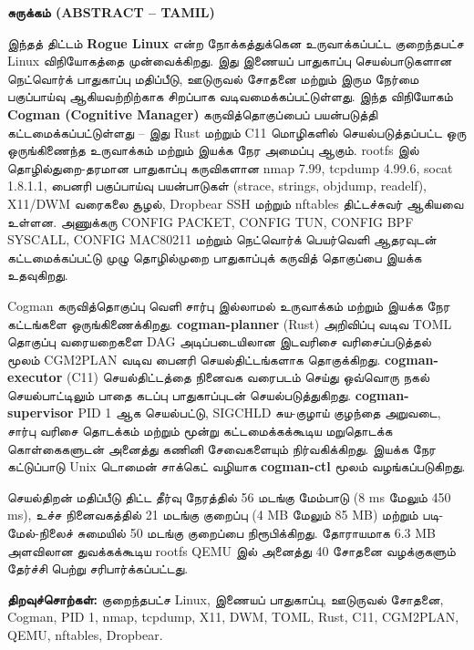 \documentclass[12pt,a4paper]{article}
\begin{document}
\thispagestyle{plain}

\begin{center}
  {\large\bfseries சுருக்கம் (ABSTRACT -- TAMIL)}
\end{center}
\vspace{10pt}

இந்தத் திட்டம் \textbf{Rogue Linux} என்ற நோக்கத்துக்கென உருவாக்கப்பட்ட குறைந்தபட்ச
Linux விநியோகத்தை முன்வைக்கிறது. இது இணையப் பாதுகாப்பு செயல்பாடுகளான நெட்வொர்க்
பாதுகாப்பு மதிப்பீடு, ஊடுருவல் சோதனை மற்றும் இரும நேர்மை பகுப்பாய்வு ஆகியவற்றிற்காக
சிறப்பாக வடிவமைக்கப்பட்டுள்ளது. இந்த விநியோகம் \textbf{Cogman (Cognitive Manager)}
கருவித்தொகுப்பைப் பயன்படுத்தி கட்டமைக்கப்பட்டுள்ளது -- இது Rust மற்றும் C11 மொழிகளில்
செயல்படுத்தப்பட்ட ஒரு ஒருங்கிணைந்த உருவாக்கம் மற்றும் இயக்க நேர அமைப்பு ஆகும். rootfs
இல் தொழில்துறை-தரமான பாதுகாப்பு கருவிகளான nmap 7.99, tcpdump 4.99.6, socat 1.8.1.1,
பைனரி பகுப்பாய்வு பயன்பாடுகள் (strace, strings, objdump, readelf), X11/DWM வரைகலை
சூழல், Dropbear SSH மற்றும் nftables திட்டச்சுவர் ஆகியவை உள்ளன. அணுக்கரு
CONFIG PACKET, CONFIG TUN, CONFIG BPF SYSCALL, CONFIG MAC80211 மற்றும் நெட்வொர்க்
பெயர்வெளி ஆதரவுடன் கட்டமைக்கப்பட்டு முழு தொழில்முறை பாதுகாப்புக் கருவித் தொகுப்பை
இயக்க உதவுகிறது.

\vspace{8pt}
Cogman கருவித்தொகுப்பு வெளி சார்பு இல்லாமல் உருவாக்கம் மற்றும் இயக்க நேர கட்டங்களை
ஒருங்கிணைக்கிறது. \textbf{cogman-planner} (Rust) அறிவிப்பு வடிவ TOML தொகுப்பு
வரையறைகளை DAG அடிப்படையிலான இடவரிசை வரிசைப்படுத்தல் மூலம் CGM2PLAN வடிவ பைனரி
செயல்திட்டங்களாக தொகுக்கிறது. \textbf{cogman-executor} (C11) செயல்திட்டத்தை நினைவக
வரைபடம் செய்து ஒவ்வொரு நகல் செயல்பாட்டிலும் பாதை கடப்பு பாதுகாப்புடன்
செயல்படுத்துகிறது. \textbf{cogman-supervisor} PID 1 ஆக செயல்பட்டு, SIGCHLD சுய-குழாய்
குழந்தை அறுவடை, சார்பு வரிசை தொடக்கம் மற்றும் மூன்று கட்டமைக்கக்கூடிய மறுதொடக்க
கொள்கைகளுடன் அனைத்து கணினி சேவைகளையும் நிர்வகிக்கிறது. இயக்க நேர கட்டுப்பாடு Unix
டொமைன் சாக்கெட் வழியாக \textbf{cogman-ctl} மூலம் வழங்கப்படுகிறது.

\vspace{8pt}
செயல்திறன் மதிப்பீடு திட்ட தீர்வு நேரத்தில் 56 மடங்கு மேம்பாடு (8 ms மேலும் 450 ms),
உச்ச நினைவகத்தில் 21 மடங்கு குறைப்பு (4 MB மேலும் 85 MB) மற்றும் படி-மேல்-நிலைச்
சுமையில் 50 மடங்கு குறைப்பை நிரூபிக்கிறது. தோராயமாக 6.3 MB அளவிலான துவக்கக்கூடிய
rootfs QEMU இல் அனைத்து 40 சோதனை வழக்குகளும் தேர்ச்சி பெற்று சரிபார்க்கப்பட்டது.

\vspace{10pt}
\noindent\textbf{திறவுச்சொற்கள்:} குறைந்தபட்ச Linux, இணையப் பாதுகாப்பு, ஊடுருவல்
சோதனை, Cogman, PID 1, nmap, tcpdump, X11, DWM, TOML, Rust, C11, CGM2PLAN, QEMU,
nftables, Dropbear.
\end{document}
